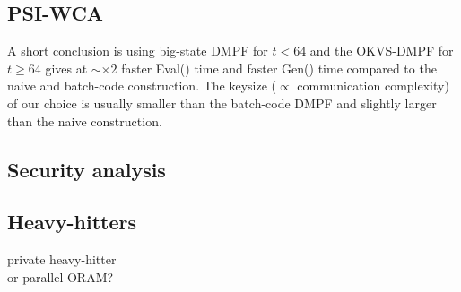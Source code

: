\subsection{PSI-WCA}
A short conclusion is using big-state DMPF for $t<64$ and the OKVS-DMPF for $t\ge 64$ gives at $\sim \times 2$ faster Eval() time and faster Gen() time compared to the naive and batch-code construction. The keysize ($\propto$ communication complexity) of our choice is usually smaller than the batch-code DMPF and slightly larger than the naive construction. 
\subsection{Security analysis}
\subsection{Heavy-hitters}
private heavy-hitter\\
or parallel ORAM?